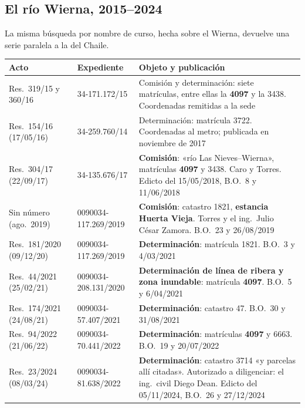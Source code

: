 \subsection*{El río Wierna, 2015--2024}

La misma búsqueda por nombre de curso, hecha sobre el Wierna, devuelve una serie paralela a la del Chaile.

{\small
\setlength{\LTpre}{0.6em}\setlength{\LTpost}{1.2em}
\begin{longtable}{@{}p{2.4cm}p{3.3cm}p{6.2cm}@{}}
\toprule
\textbf{Acto} & \textbf{Expediente} & \textbf{Objeto y publicación} \\
\midrule
\endhead
Res.\ 319/15 y 360/16 & 34-171.172/15 & Comisión y determinación: siete matrículas, entre ellas la \textbf{4097} y la 3438. Coordenadas remitidas a la sede \\
Res.\ 154/16 (17/05/16) & 34-259.760/14 & Determinación: matrícula 3722. Coordenadas al metro; publicada en noviembre de 2017 \\
Res.\ 304/17 (22/09/17) & 34-135.676/17 & \textbf{Comisión}: «río Las Nieves--Wierna», matrículas \textbf{4097} y 3438. Caro y Torres. Edicto del 15/05/2018, B.O.\ 8 y 11/06/2018 \\
Sin número (ago.\ 2019) & 0090034-117.269/2019 & \textbf{Comisión}: catastro 1821, \textbf{estancia Huerta Vieja}. Torres y el ing.\ Julio César Zamora. B.O.\ 23 y 26/08/2019 \\
Res.\ 181/2020 (09/12/20) & 0090034-117.269/2019 & \textbf{Determinación}: matrícula 1821. B.O.\ 3 y 4/03/2021 \\
Res.\ 44/2021 (25/02/21) & 0090034-208.131/2020 & \textbf{Determinación de línea de ribera y zona inundable}: matrícula \textbf{4097}. B.O.\ 5 y 6/04/2021 \\
Res.\ 174/2021 (24/08/21) & 0090034-57.407/2021 & \textbf{Determinación}: catastro 47. B.O.\ 30 y 31/08/2021 \\
Res.\ 94/2022 (21/06/22) & 0090034-70.441/2022 & \textbf{Determinación}: matrículas \textbf{4097} y 6663. B.O.\ 19 y 20/07/2022 \\
Res.\ 23/2024 (08/03/24) & 0090034-81.638/2022 & \textbf{Determinación}: catastro 3714 «y parcelas allí citadas». Autorizado a diligenciar: el ing.\ civil Diego Dean. Edicto del 05/11/2024, B.O.\ 26 y 27/12/2024 \\
\bottomrule
\end{longtable}
}


